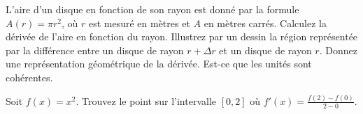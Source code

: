 \begin{question}
L'aire d'un disque en fonction de son rayon est donné par la formule
$A(r) = \pi r^2$, où $r$ est mesuré en mètres et $A$ en mètres
carrés.  Calculez la dérivée de l'aire en fonction du rayon.
Illustrez par un dessin la région représentée par la différence entre
un disque de rayon $r+\Delta r$ et un disque de rayon $r$.  Donnez une
représentation géométrique de la dérivée.  Est-ce que les unités sont
cohérentes.
\label{5Q38}
\end{question}

\begin{question}[\life \eng]
Soit $f(x) = x^2$.  Trouvez le point sur l'intervalle $[0,2]$ où
$\displaystyle f'(x) = \frac{f(2)-f(0)}{2-0}$.  
\label{5Q39}
\end{question}

